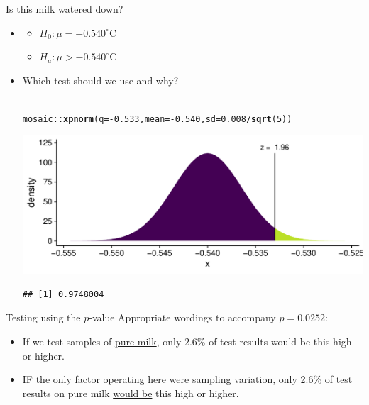 \documentclass[10pt]{beamer}\usepackage[]{graphicx}\usepackage[]{color}
\makeatletter
\def\maxwidth{ %
  \ifdim\Gin@nat@width>\linewidth
    \linewidth
  \else
    \Gin@nat@width
  \fi
}
\newcommand{\hlnum}[1]{\textcolor[rgb]{0.686,0.059,0.569}{#1}}%
\newcommand{\hlopt}[1]{\textcolor[rgb]{0,0,0}{#1}}%
\newcommand{\hlstd}[1]{\textcolor[rgb]{0.345,0.345,0.345}{#1}}%
\newcommand{\hlkwc}[1]{\textcolor[rgb]{0.333,0.667,0.333}{#1}}%
\newcommand{\hlkwd}[1]{\textcolor[rgb]{0.737,0.353,0.396}{\textbf{#1}}}%
\newenvironment{kframe}{%
 \def\at@end@of@kframe{}%
 \ifinner\ifhmode%
  \def\at@end@of@kframe{\end{minipage}}%
  \begin{minipage}{\columnwidth}%
 \fi\fi%
 \def\FrameCommand##1{\hskip\@totalleftmargin \hskip-\fboxsep
 \colorbox{shadecolor}{##1}\hskip-\fboxsep
     \hskip-\linewidth \hskip-\@totalleftmargin \hskip\columnwidth}%
 \MakeFramed {\advance\hsize-\width
   \@totalleftmargin\z@ \linewidth\hsize
   \@setminipage}}%
 {\par\unskip\endMakeFramed%
 \at@end@of@kframe}
\newenvironment{knitrout}{}{} %
\makeatother
\begin{document}
\begin{frame}[fragile]{Is this milk watered down?}
	\begin{itemize}
		\setlength\itemsep{.7em}
		\item {} \pause \begin{itemize}
			\item $H_0: \mu =  -0.540^{\circ}$C \pause
			\item  $H_a: \mu >  -0.540^{\circ}$C
		\end{itemize}
		\item Which test should we use and why? \pause \\ \ \\
		
		
\begin{knitrout}\tiny
{}\color{fgcolor}\begin{kframe}
\begin{alltt}
\hlstd{mosaic}\hlopt{::}\hlkwd{xpnorm}\hlstd{(}\hlkwc{q} \hlstd{=} \hlopt{-}\hlnum{0.533}\hlstd{,} \hlkwc{mean} \hlstd{=} \hlopt{-}\hlnum{0.540}\hlstd{,} \hlkwc{sd} \hlstd{=} \hlnum{0.008}\hlopt{/}\hlkwd{sqrt}\hlstd{(}\hlnum{5}\hlstd{))}
\end{alltt}
\end{kframe}

{\centering \includegraphics[width=\maxwidth]{figure/unnamed-chunk-2-1} 

}


\begin{kframe}\begin{verbatim}
## [1] 0.9748004
\end{verbatim}
\end{kframe}
\end{knitrout}
		
	\end{itemize}
\end{frame}

\begin{frame}[fragile]{Testing using the $p$-value}
	Appropriate wordings to accompany $p=0.0252$:
	\begin{itemize}
		\setlength\itemsep{1.5em}
		\item If we test samples of \underline{pure milk}, only 2.6\% of test results would be this high or higher.
		\pause 
		\item \underline{IF} the \underline{only} factor operating here were sampling variation, only  2.6\% of test results on pure milk  \underline{would be} this high or higher.
	\end{itemize}
	
\end{frame}
\end{document}
